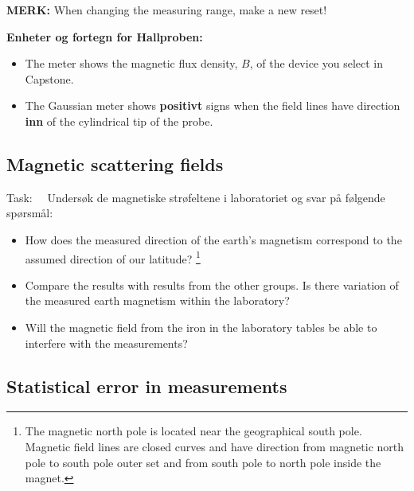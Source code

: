 \documentclass[../Elmag-labhefte-2020.tex]{subfiles}
\begin{document}
\textbf{MERK:} When changing the measuring range, make a new reset!

\textbf{Enheter og fortegn for Hallproben:}
\vspace{-5mm}
\begin{itemize}
    \item The meter shows the magnetic flux density, $B$, of the device you select in Capstone.
    \item The Gaussian meter shows \textbf{positivt} signs when the field lines have direction \textbf{inn} of the cylindrical tip of the probe.
\end{itemize}

\subsection{Magnetic scattering fields}

Task: \ \
{\itsf Undersøk de magnetiske strøfeltene i laboratoriet og svar på følgende spørsmål:}
\vspace{-5mm}
\begin{itemize}
    \item How does the measured direction of the earth's magnetism correspond to the assumed direction of our latitude? \footnote{The magnetic north pole is located near the geographical south pole. Magnetic field lines are closed curves and have direction from magnetic north pole to south pole outer set and from south pole to north pole inside the magnet.}
    \item Compare the results with results from the other groups. Is there variation of the measured earth magnetism within the laboratory?
    \item Will the magnetic field from the iron in the laboratory tables be able to interfere with the measurements?
\end{itemize}



\subsection{Statistical error in measurements}
\end{document}
